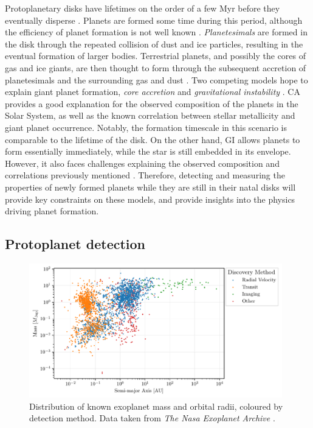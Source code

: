 Protoplanetary disks have lifetimes on the order of a few Myr before they eventually disperse \citep{mamajek2009}.
Planets are formed some time during this period, although the efficiency of planet formation is not well known \citep[see review by][]{helled2014}.
\textit{Planetesimals} are formed in the disk through the repeated collision of dust and ice particles, resulting in the eventual formation of larger bodies.
Terrestrial planets, and possibly the cores of gas and ice giants, are then thought to form through the subsequent accretion of planetesimals and the surrounding gas and dust \citep[e.g.][]{johansen2014}.
Two competing models hope to explain giant planet formation, \textit{core accretion} \citep[CA;][]{safronov1972,lissauer1993,pollack1996} and \textit{gravitational instability} \citep[GI;][]{boss1997}.
CA provides a good explanation for the observed composition of the planets in the Solar System, as well as the known correlation between stellar metallicity and giant planet occurrence.
Notably, the formation timescale in this scenario is comparable to the lifetime of the disk.
On the other hand, GI allows planets to form essentially immediately, while the star is still embedded in its envelope.
However, it also faces challenges explaining the observed composition and correlations previously mentioned \citep[see review by][]{helled2014}.
Therefore, detecting and measuring the properties of newly formed planets while they are still in their natal disks will provide key constraints on these models, and provide insights into the physics driving planet formation.

\subsection{Protoplanet detection}

\begin{figure}
    \centering
    \includegraphics[width = 0.98\textwidth]{figures/exoplanet.pdf}
    \caption{Distribution of known exoplanet mass and orbital radii, coloured by detection method. Data taken from \textit{The Nasa Exoplanet Archive} \citep{nasa2022}.}
    \label{fig:exoplanets}
\end{figure}


